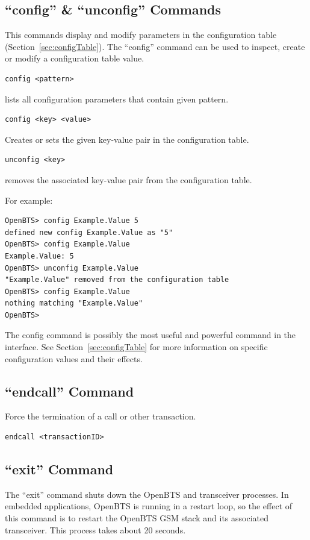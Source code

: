\documentclass[11pt,openany]{book}
\begin{document}
\subsection{``config'' \& ``unconfig'' Commands}
\label{sec:configCmd}
\label{sec:unconfigCmd}
This commands display and modify parameters in the configuration table (Section~\ref{sec:configTable}).
The ``config'' command can be used to inspect, create or modify a configuration table value.

\begin{verbatim}
config <pattern>
\end{verbatim}
lists all configuration parameters that contain given pattern.
\begin{verbatim}
config <key> <value>
\end{verbatim}
Creates or sets the given key-value pair in the configuration table.
\begin{verbatim}
unconfig <key>
\end{verbatim}
removes the associated key-value pair from the configuration table.

For example:
\begin{verbatim}
OpenBTS> config Example.Value 5
defined new config Example.Value as "5"
OpenBTS> config Example.Value
Example.Value: 5
OpenBTS> unconfig Example.Value
"Example.Value" removed from the configuration table
OpenBTS> config Example.Value
nothing matching "Example.Value"
OpenBTS>
\end{verbatim}

The config command is possibly the most useful and powerful command in the interface.
See Section~\ref{sec:configTable} for more information on specific configuration values and their effects.

\subsection{``endcall'' Command}
Force the termination of a call or other transaction.
\begin{verbatim}
endcall <transactionID>
\end{verbatim}



\subsection{``exit'' Command}
\label{sec:exitCmd}
The ``exit'' command shuts down the OpenBTS and transceiver processes.
In embedded applications, OpenBTS is running in a restart loop, so the effect of this command is to restart the OpenBTS GSM stack and its associated transceiver.
This process takes about 20 seconds.
\end{document}
